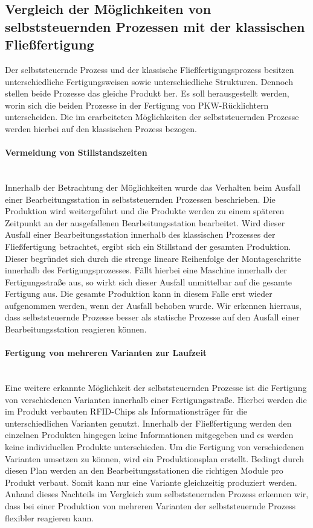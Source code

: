 \subsection{Vergleich der Möglichkeiten von selbststeuernden Prozessen mit der klassischen Fließfertigung}
\label{sec:Vergleich_der_Moeglichkeiten}

Der selbststeuernde Prozess und der klassische Fließfertigungsprozess besitzen
unterschiedliche Fertigungsweisen sowie unterschiedliche Strukturen. Dennoch
stellen beide Prozesse das gleiche Produkt her. Es soll herausgestellt werden,
worin sich die beiden Prozesse in der Fertigung von PKW-Rücklichtern
unterscheiden. Die im  erarbeiteten Möglichkeiten der
selbststeuernden Prozesse werden hierbei auf den klassischen Prozess bezogen.

\paragraph{Vermeidung von Stillstandszeiten}\hfill \\
Innerhalb der Betrachtung der Möglichkeiten wurde das Verhalten beim Ausfall
einer Bearbeitungsstation in selbststeuernden Prozessen beschrieben. Die
Produktion wird weitergeführt und die Produkte werden zu einem späteren
Zeitpunkt an der ausgefallenen Bearbeitungsstation bearbeitet. Wird dieser
Ausfall einer Bearbeitungsstation innerhalb des klassischen Prozesses der
Fließfertigung betrachtet, ergibt sich ein Stillstand der gesamten Produktion.
Dieser begründet sich durch die strenge lineare Reihenfolge der Montageschritte
innerhalb des Fertigungsprozesses. Fällt hierbei eine Maschine innerhalb der
Fertigungsstraße aus, so wirkt sich dieser Ausfall unmittelbar auf die gesamte
Fertigung aus. Die gesamte Produktion kann in diesem Falle erst wieder
aufgenommen werden, wenn der Ausfall behoben wurde. Wir erkennen hierraus, dass
selbststeuernde Prozesse besser als statische Prozesse  auf den Ausfall einer
Bearbeitungsstation reagieren können.

\paragraph{Fertigung von mehreren Varianten zur Laufzeit} \hfill \\
Eine weitere erkannte Möglichkeit der selbststeuernden Prozesse ist die
Fertigung von verschiedenen Varianten innerhalb einer Fertigungsstraße. Hierbei
werden die im Produkt verbauten RFID-Chips als Informationsträger für die
unterschiedlichen Varianten genutzt. Innerhalb der Fließfertigung werden den
einzelnen Produkten hingegen keine Informationen mitgegeben und es werden
keine individuellen Produkte unterschieden. Um die Fertigung von verschiedenen
Varianten umsetzen zu können, wird ein Produktionsplan erstellt.
Bedingt durch diesen Plan werden an den Bearbeitungsstationen die richtigen
Module pro Produkt verbaut. Somit kann nur eine Variante gleichzeitig
produziert werden. Anhand dieses Nachteils im Vergleich zum selbststeuernden
Prozess erkennen wir, dass bei einer Produktion von mehreren Varianten der
selbststeuernde Prozess flexibler reagieren kann.



